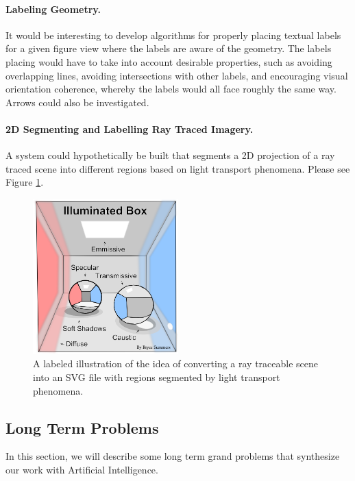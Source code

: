 \documentclass[12pt, letterpaper]{article}
\begin{document}
		\paragraph{Labeling Geometry.}

		It would be interesting to develop algorithms for properly placing textual labels for a given figure view where the labels are aware of the geometry.
		The labels placing would have to take into account desirable properties, such as avoiding overlapping lines, avoiding intersections with other labels, and encouraging visual orientation coherence, whereby the labels would all face roughly the same way.
		Arrows could also be investigated.

		\paragraph{2D Segmenting and Labelling Ray Traced Imagery.}

		A system could hypothetically be built that segments a 2D projection of a ray traced scene into different regions based on light transport phenomena.
		Please see Figure \ref{fig:cornell_box_illustration}.

		\begin{figure}[h]
		\centering
		\includegraphics[width=0.5\textwidth]{cornell_box_illustration}
		\caption{A labeled illustration of the idea of converting a ray traceable scene into an SVG file with regions segmented by light transport phenomena.}
		\label{fig:cornell_box_illustration}
		\end{figure}


	\subsection{Long Term Problems}

		In this section, we will describe some long term grand problems that synthesize our work with Artificial Intelligence.
\end{document}
